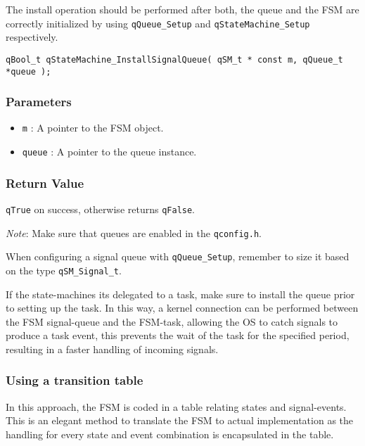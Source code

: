 The install operation should be performed after both, the queue and the FSM are correctly initialized by using \lstinline{qQueue_Setup} and \lstinline{qStateMachine_Setup} respectively.
\medskip

\begin{lstlisting}[style=CStyle]
qBool_t qStateMachine_InstallSignalQueue( qSM_t * const m, qQueue_t *queue );
\end{lstlisting} 

\subsubsection*{Parameters}
\begin{itemize}
    \item \lstinline{m} : A pointer to the FSM object. 
    \item \lstinline{queue} : A pointer to the queue instance. 
\end{itemize}

\subsubsection*{Return Value}
\lstinline{qTrue} on success, otherwise returns \lstinline{qFalse}.

\hrulefill
\medskip

\begin{tcolorbox}
\ArrowBoldDownRight \textit{Note}: Make sure that queues are enabled in the \lstinline{qconfig.h}.
\end{tcolorbox}

\begin{tcolorbox}
\HandRight When configuring a signal queue with \lstinline{qQueue_Setup}, remember to size it based on the type \lstinline{qSM_Signal_t}.
\end{tcolorbox}

\begin{tcolorbox}
\HandRight If the state-machines its delegated to a task, make sure to install the queue prior to setting up the task. In this way, a kernel connection can be performed between the FSM signal-queue and the FSM-task, allowing the OS to catch signals to produce a task event, this prevents the wait of the task for the specified period, resulting in a faster handling of incoming signals.
\end{tcolorbox}

\subsubsection{Using a transition table}
In this approach, the FSM is coded in a table relating states and signal-events. 
This is an elegant method to translate the FSM to actual implementation as the handling for every state and event combination is encapsulated in the table. 

